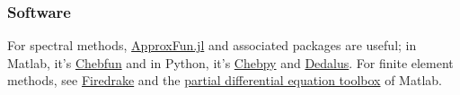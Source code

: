 \documentclass[12pt,a4paper]{article}
\begin{document}
\subsubsection{Software}
For spectral methods, \href{https://juliaapproximation.github.io/ApproxFun.jl/latest/}{ApproxFun.jl} and associated packages are useful; in Matlab, it's \href{https://www.chebfun.org/}{Chebfun} and in Python, it's \href{https://github.com/chebpy/chebpy}{Chebpy} and \href{https://dedalus-project.org/}{Dedalus}.  For finite element methods, see \href{https://www.firedrakeproject.org/}{Firedrake} and the \href{https://uk.mathworks.com/products/pde.html}{partial differential equation toolbox} of Matlab. 
\end{document}
